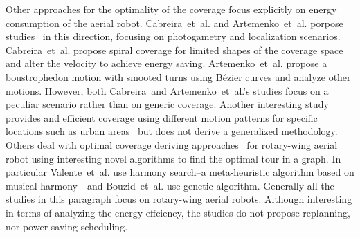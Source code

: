 Other approaches for the optimality of the coverage focus explicitly on energy consumption of the aerial robot. Cabreira~et~al. and Artemenko~et~al. porpose studies~\citep{cabreira2018energy,artemenko2016energy} in this direction, focusing on photogametry and localization scenarios. Cabreira~et~al. propose spiral coverage for limited shapes of the coverage space and alter the velocity to achieve energy saving. Artemenko~et~al. propose a boustrophedon motion with smooted turns using B\'{e}zier curves and analyze other motions. However, both Cabreira~and Artemenko~et~al.'s studies focus on a peculiar scenario rather than on generic coverage. Another interesting study provides and efficient coverage using different motion patterns for specific locations such as urban areas~\citep{dille2013efficient} but does not derive a generalized methodology. Others deal with optimal coverage deriving approaches~\citep{valente2013aerial,bouzid2017quadrotor} for rotary-wing aerial robot using interesting novel algorithms to find the optimal tour in a graph. In particular Valente~et~al. use harmony search--a meta-heuristic algorithm based on musical harmony~\citep{geem2009music}--and Bouzid~et~al. use genetic algorithm. Generally all the studies in this paragraph focus on rotary-wing aerial robots. Although interesting in terms of analyzing the energy effciency, the studies do not propose replanning, nor power-saving scheduling.













